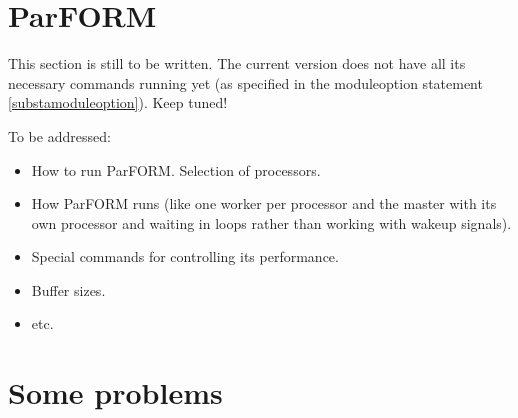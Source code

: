 
\section{ParFORM}
\label{parform}

This section is still to be written. The current version does not have all 
its necessary commands running yet (as specified in the moduleoption 
statement \ref{substamoduleoption}). Keep tuned!

To be addressed:
\begin{itemize}
\item How to run ParFORM. Selection of processors.
\item How ParFORM runs (like one worker per processor and the master with 
its own processor and waiting in loops rather than working with wakeup 
signals).
\item Special commands for controlling its performance.
\item Buffer sizes.
\item etc.
\end{itemize}


\section{Some problems}

